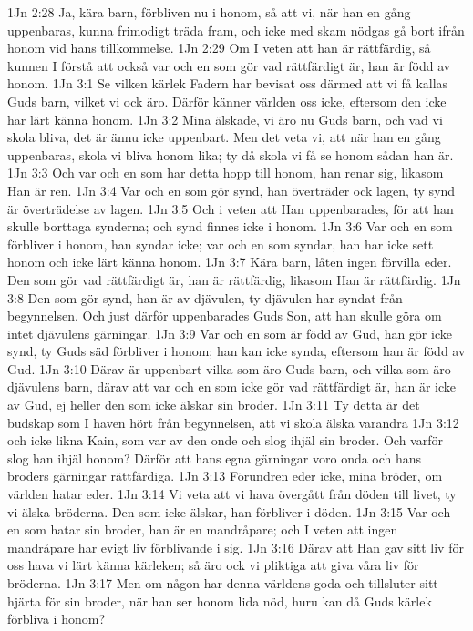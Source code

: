 1Jn 2:28  Ja, kära barn, förbliven nu i honom, så att vi, när han en gång uppenbaras, kunna frimodigt träda fram, och icke med skam nödgas gå bort ifrån honom vid hans tillkommelse.
1Jn 2:29  Om I veten att han är rättfärdig, så kunnen I förstå att också var och en som gör vad rättfärdigt är, han är född av honom.
1Jn 3:1  Se vilken kärlek Fadern har bevisat oss därmed att vi få kallas Guds barn, vilket vi ock äro. Därför känner världen oss icke, eftersom den icke har lärt känna honom.
1Jn 3:2  Mina älskade, vi äro nu Guds barn, och vad vi skola bliva, det är ännu icke uppenbart. Men det veta vi, att när han en gång uppenbaras, skola vi bliva honom lika; ty då skola vi få se honom sådan han är.
1Jn 3:3  Och var och en som har detta hopp till honom, han renar sig, likasom Han är ren.
1Jn 3:4  Var och en som gör synd, han överträder ock lagen, ty synd är överträdelse av lagen.
1Jn 3:5  Och i veten att Han uppenbarades, för att han skulle borttaga synderna; och synd finnes icke i honom.
1Jn 3:6  Var och en som förbliver i honom, han syndar icke; var och en som syndar, han har icke sett honom och icke lärt känna honom.
1Jn 3:7  Kära barn, låten ingen förvilla eder. Den som gör vad rättfärdigt är, han är rättfärdig, likasom Han är rättfärdig.
1Jn 3:8  Den som gör synd, han är av djävulen, ty djävulen har syndat från begynnelsen. Och just därför uppenbarades Guds Son, att han skulle göra om intet djävulens gärningar.
1Jn 3:9  Var och en som är född av Gud, han gör icke synd, ty Guds säd förbliver i honom; han kan icke synda, eftersom han är född av Gud.
1Jn 3:10  Därav är uppenbart vilka som äro Guds barn, och vilka som äro djävulens barn, därav att var och en som icke gör vad rättfärdigt är, han är icke av Gud, ej heller den som icke älskar sin broder.
1Jn 3:11  Ty detta är det budskap som I haven hört från begynnelsen, att vi skola älska varandra
1Jn 3:12  och icke likna Kain, som var av den onde och slog ihjäl sin broder. Och varför slog han ihjäl honom? Därför att hans egna gärningar voro onda och hans broders gärningar rättfärdiga.
1Jn 3:13  Förundren eder icke, mina bröder, om världen hatar eder.
1Jn 3:14  Vi veta att vi hava övergått från döden till livet, ty vi älska bröderna. Den som icke älskar, han förbliver i döden.
1Jn 3:15  Var och en som hatar sin broder, han är en mandråpare; och I veten att ingen mandråpare har evigt liv förblivande i sig.
1Jn 3:16  Därav att Han gav sitt liv för oss hava vi lärt känna kärleken; så äro ock vi pliktiga att giva våra liv för bröderna.
1Jn 3:17  Men om någon har denna världens goda och tillsluter sitt hjärta för sin broder, när han ser honom lida nöd, huru kan då Guds kärlek förbliva i honom?
